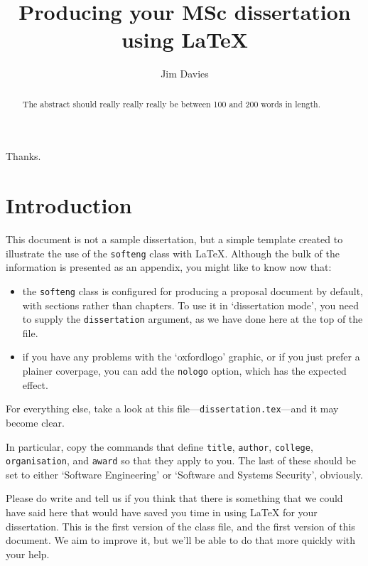 \documentclass[dissertation]{softeng}
\title{Producing your MSc dissertation \\ using \LaTeX}
\author{Jim Davies}
\begin{document}
\maketitle

\begin{abstract}
  The abstract should really really really be between 100 and 200
  words in length.
\end{abstract}

\clearpage

\begin{acknowledgements}
  Thanks.  
\end{acknowledgements}

\clearpage

\pagestyle{plain}
\setcounter{tocdepth}{2}

\tableofcontents

\clearpage

\pagestyle{myheadings}

\chapter{Introduction}

This document is not a sample dissertation, but a simple template
created to illustrate the use of the \verb|softeng| class with
\LaTeX.  Although the bulk of the information is presented as an
appendix, you might like to know now that: 
\begin{itemize}
\item the \verb|softeng| class is configured for producing a proposal
  document by default, with sections rather than chapters.  To use it
  in `dissertation mode', you need to supply the \verb|dissertation|
  argument, as we have done here at the top of the file.
\item if you have any problems with the `oxfordlogo' graphic, or if
  you just prefer a plainer coverpage, you can add the \verb|nologo|
  option, which has the expected effect. 
\end{itemize}
For everything else, take a look at this
file---\verb|dissertation.tex|---and it may become clear. 

In particular, copy the commands that define \verb|title|,
\verb|author|, \verb|college|, \verb|organisation|, and \verb|award|
so that they apply to you.  The last of these should be set to either
`Software Engineering' or `Software and Systems Security', obviously.

Please do write and tell us if you think that there is something that
we could have said here that would have saved you time in using
{\LaTeX} for your dissertation.  This is the first version of the
class file, and the first version of this document.  We aim to improve
it, but we'll be able to do that more quickly with your help.
\end{document}
